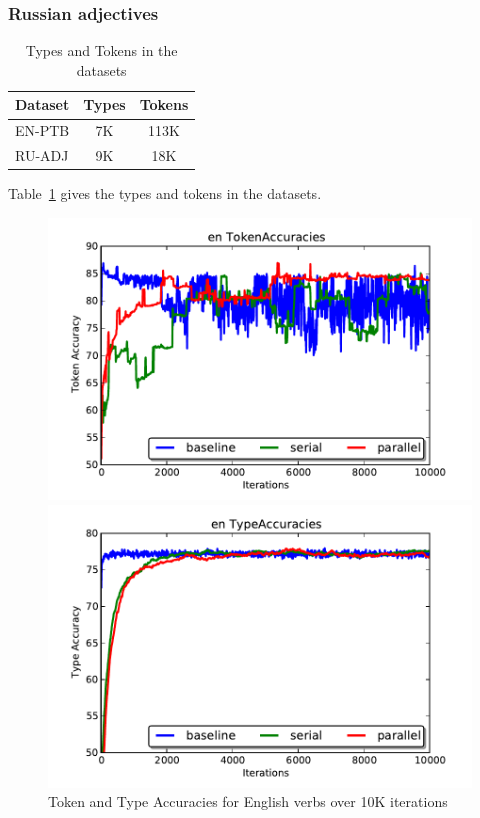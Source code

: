 \subsubsection{Russian adjectives}


\begin{table}[h]
\centering
\begin{tabular}{lcc}
\hline
Dataset & Types & Tokens \\
\hline
EN-PTB & 7K & 113K \\
RU-ADJ & 9K & 18K \\
\hline
\end{tabular}
\caption{Types and Tokens in the datasets}
\label{datastats}
\end{table}

Table~\ref{datastats} gives the types and tokens in the datasets.

\begin{figure}[ht]
\begin{minipage}[b]{0.45\linewidth}
\centering
\includegraphics[width=\textwidth]{fig/en_TokenAccuracies}
\end{minipage}
\hspace{0.5cm}
\begin{minipage}[b]{0.45\linewidth}
\centering
\includegraphics[width=\textwidth]{fig/en_TypeAccuracies}
\end{minipage}
\caption{\label{fig:enacc}Token and Type Accuracies for English verbs over 10K iterations}
\end{figure}

